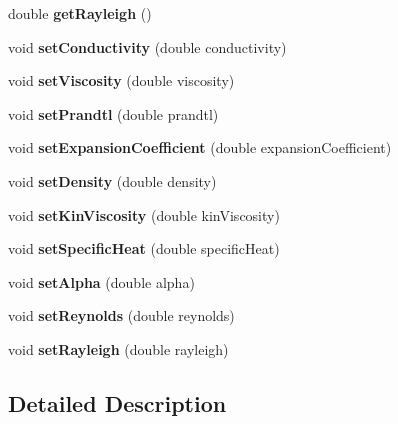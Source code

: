 \begin{DoxyCompactItemize}
double {\bfseries get\+Rayleigh} ()
\item 
\mbox{\label{class_air_properties_a3bfb9925671f251f5983f919d663b065}} 
void {\bfseries set\+Conductivity} (double conductivity)
\item 
\mbox{\label{class_air_properties_acbf2ba9c4555699e82e76f6f250a7613}} 
void {\bfseries set\+Viscosity} (double viscosity)
\item 
\mbox{\label{class_air_properties_aa01afbbf8dc220b2db641623417fcaa6}} 
void {\bfseries set\+Prandtl} (double prandtl)
\item 
\mbox{\label{class_air_properties_acd587b762844b90db835b8796b45ca50}} 
void {\bfseries set\+Expansion\+Coefficient} (double expansion\+Coefficient)
\item 
\mbox{\label{class_air_properties_af3c351767343b2e15e6b82940865ad07}} 
void {\bfseries set\+Density} (double density)
\item 
\mbox{\label{class_air_properties_aed8aee8df557e3cdac8eb7903e116e15}} 
void {\bfseries set\+Kin\+Viscosity} (double kin\+Viscosity)
\item 
\mbox{\label{class_air_properties_a42a4fd4914ca8ca93d20da4a2e51a806}} 
void {\bfseries set\+Specific\+Heat} (double specific\+Heat)
\item 
\mbox{\label{class_air_properties_a5313343ff1ee238e086ad42bab836449}} 
void {\bfseries set\+Alpha} (double alpha)
\item 
\mbox{\label{class_air_properties_aed80404187136ab3c6b0afff9695314c}} 
void {\bfseries set\+Reynolds} (double reynolds)
\item 
\mbox{\label{class_air_properties_a3f6aaaa2eb865479ff31c88529803bbf}} 
void {\bfseries set\+Rayleigh} (double rayleigh)
\end{DoxyCompactItemize}


\subsection{Detailed Description}


